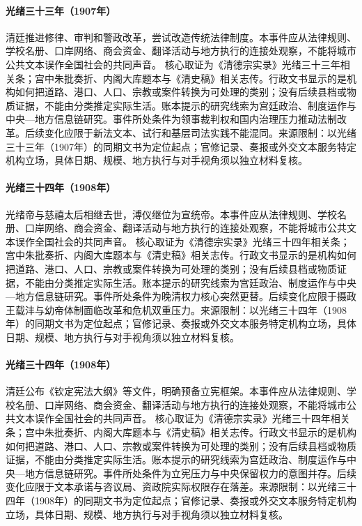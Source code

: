 \hypertarget{civic:EQ-1907-QING-LEGAL-REFORM}{}\paragraph{光绪三十三年（1907年）}清廷推进修律、审判和警政改革，尝试改造传统法律制度。本事件应从法律规则、学校名册、口岸网络、商会资金、翻译活动与地方执行的连接处观察，不能将城市公共文本误作全国社会的共同声音。 核心取证为《清德宗实录》光绪三十三年相关条；宫中朱批奏折、内阁大库题本与《清史稿》相关志传。行政文书显示的是机构如何把道路、港口、人口、宗教或案件转换为可处理的类别；没有后续县档或物质证据，不能由分类推定实际生活。账本提示的研究线索为宫廷政治、制度运作与中央—地方信息链研究。事件所处条件为领事裁判权和国内治理压力推动法制改革。后续变化应限于新法文本、试行和基层司法实践不能混同。来源限制：以光绪三十三年（1907年）的同期文书为定位起点；官修记录、奏报或外交文本服务特定机构立场，具体日期、规模、地方执行与对手视角须以独立材料复核。
\hypertarget{civic:EQ-1908-GUANGXU-CIXI-DEATHS}{}\paragraph{光绪三十四年（1908年）}光绪帝与慈禧太后相继去世，溥仪继位为宣统帝。本事件应从法律规则、学校名册、口岸网络、商会资金、翻译活动与地方执行的连接处观察，不能将城市公共文本误作全国社会的共同声音。 核心取证为《清德宗实录》光绪三十四年相关条；宫中朱批奏折、内阁大库题本与《清史稿》相关志传。行政文书显示的是机构如何把道路、港口、人口、宗教或案件转换为可处理的类别；没有后续县档或物质证据，不能由分类推定实际生活。账本提示的研究线索为宫廷政治、制度运作与中央—地方信息链研究。事件所处条件为晚清权力核心突然更替。后续变化应限于摄政王载沣与幼帝体制面临改革和危机双重压力。来源限制：以光绪三十四年（1908年）的同期文书为定位起点；官修记录、奏报或外交文本服务特定机构立场，具体日期、规模、地方执行与对手视角须以独立材料复核。
\hypertarget{civic:EQ-1908-CONSTITUTIONAL-OUTLINE}{}\paragraph{光绪三十四年（1908年）}清廷公布《钦定宪法大纲》等文件，明确预备立宪框架。本事件应从法律规则、学校名册、口岸网络、商会资金、翻译活动与地方执行的连接处观察，不能将城市公共文本误作全国社会的共同声音。 核心取证为《清德宗实录》光绪三十四年相关条；宫中朱批奏折、内阁大库题本与《清史稿》相关志传。行政文书显示的是机构如何把道路、港口、人口、宗教或案件转换为可处理的类别；没有后续县档或物质证据，不能由分类推定实际生活。账本提示的研究线索为宫廷政治、制度运作与中央—地方信息链研究。事件所处条件为立宪压力与中央保留权力的意图并存。后续变化应限于文本承诺与咨议局、资政院实际权限存在落差。来源限制：以光绪三十四年（1908年）的同期文书为定位起点；官修记录、奏报或外交文本服务特定机构立场，具体日期、规模、地方执行与对手视角须以独立材料复核。
